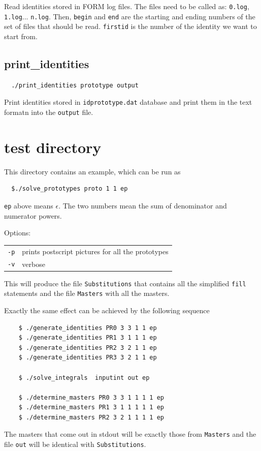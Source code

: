 \documentclass[a4paper,11pt]{article}
\begin{document}
Read identities stored in FORM log files. The files need to be called as:
\verb+0.log+, \verb+1.log+... \verb+n.log+. Then, \verb+begin+ and \verb+end+
are the starting and ending numbers of the set of files that should be read.
\verb+firstid+ is the number of the identity we want to start from.

\subsection{print\_identities}


\begin{verbatim}
  ./print_identities prototype output
\end{verbatim}

Print identities stored in \verb+idprototype.dat+ database and print them in the
text formatn into the  \verb+output+ file.

\section{test directory}

This directory contains an example, which can be run as
%
\begin{verbatim}
  $./solve_prototypes proto 1 1 ep
\end{verbatim}
%
\verb+ep+ above means $\epsilon$. The two numbers mean the sum of denominator
and numerator powers.

Options:  

\begin{tabular}{ll}
  \verb+-p+ & prints postscript pictures for all the prototypes \\
  \verb+-v+ & verbose
\end{tabular}

This will produce the file \verb+Substitutions+ that contains all the simplified
\verb+fill+ statements and the file \verb+Masters+ with all the masters.

Exactly the same effect can be achieved by the following sequence

\begin{verbatim}
    $ ./generate_identities PR0 3 3 1 1 ep
    $ ./generate_identities PR1 3 1 1 1 ep
    $ ./generate_identities PR2 3 2 1 1 ep
    $ ./generate_identities PR3 3 2 1 1 ep

    $ ./solve_integrals  inputint out ep

    $ ./determine_masters PR0 3 3 1 1 1 1 ep
    $ ./determine_masters PR1 3 1 1 1 1 1 ep
    $ ./determine_masters PR2 3 2 1 1 1 1 ep
\end{verbatim}
%
The masters that come out in stdout will be exactly those from \verb+Masters+
and the file \verb+out+ will be identical with \verb+Substitutions+.
\end{document}
